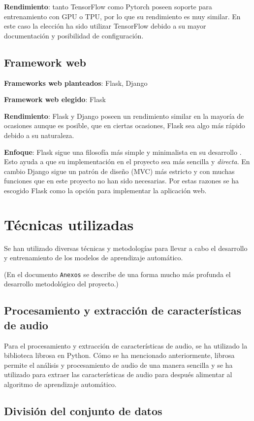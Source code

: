 \textbf{Rendimiento}: tanto TensorFlow como Pytorch poseen soporte para entrenamiento con GPU o TPU, por lo que su rendimiento es muy similar. En este caso la elección ha sido utilizar TensorFlow debido a su mayor documentación y posibilidad de configuración.

\subsection{Framework web}
\textbf{Frameworks web planteados}: Flask, Django

\textbf{Framework web elegido}: Flask

\textbf{Rendimiento}: Flask y Django poseen un rendimiento similar en la mayoría de ocasiones aunque es posible, que en ciertas ocasiones, Flask sea algo más rápido debido a su naturaleza.

\textbf{Enfoque}: Flask sigue una filosofía más simple y minimalista en su desarrollo \cite{Campbell_2023}. Esto ayuda a que su implementación en el proyecto sea más sencilla y \textit{directa}. En cambio Django sigue un patrón de diseño (MVC) más estricto y con muchas funciones que en este proyecto no han sido necesarias.
Por estas razones se ha escogido Flask como la opción para implementar la aplicación web.

\section{Técnicas utilizadas}

Se han utilizado diversas técnicas y metodologías para llevar a cabo el desarrollo y entrenamiento de los modelos de aprendizaje automático.

(En el documento \texttt{Anexos} se describe de una forma mucho más profunda el desarrollo metodológico del proyecto.)

\subsection{Procesamiento y extracción de características de audio}

Para el procesamiento y extracción de características de audio, se ha utilizado la biblioteca librosa en Python. Cómo se ha mencionado anteriormente, librosa permite el análisis y procesamiento de audio de una manera sencilla y se ha utilizado para extraer las características de audio para después alimentar al algoritmo de aprendizaje automático.

\subsection{División del conjunto de datos}

